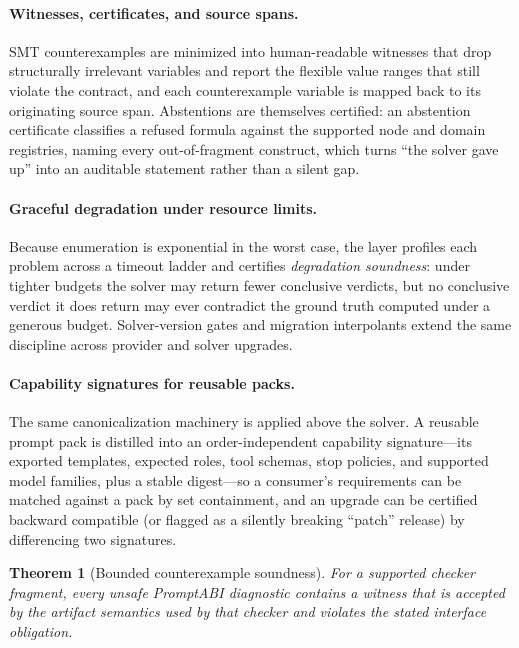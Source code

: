 \documentclass[10pt]{article}
\newtheorem{theorem}{Theorem}
\begin{document}
\paragraph{Witnesses, certificates, and source spans.}
SMT counterexamples are minimized into human-readable witnesses that drop
structurally irrelevant variables and report the flexible value ranges that
still violate the contract, and each counterexample variable is mapped back to
its originating source span. Abstentions are themselves certified: an abstention
certificate classifies a refused formula against the supported node and domain
registries, naming every out-of-fragment construct, which turns ``the solver
gave up'' into an auditable statement rather than a silent gap.

\paragraph{Graceful degradation under resource limits.}
Because enumeration is exponential in the worst case, the layer profiles each
problem across a timeout ladder and certifies \emph{degradation soundness}: under
tighter budgets the solver may return fewer conclusive verdicts, but no
conclusive verdict it does return may ever contradict the ground truth computed
under a generous budget. Solver-version gates and migration interpolants extend
the same discipline across provider and solver upgrades.

\paragraph{Capability signatures for reusable packs.}
The same canonicalization machinery is applied above the solver. A reusable
prompt pack is distilled into an order-independent capability signature---its
exported templates, expected roles, tool schemas, stop policies, and supported
model families, plus a stable digest---so a consumer's requirements can be
matched against a pack by set containment, and an upgrade can be certified
backward compatible (or flagged as a silently breaking ``patch'' release) by
differencing two signatures.

\begin{theorem}[Bounded counterexample soundness]
For a supported checker fragment, every unsafe PromptABI diagnostic contains a
witness that is accepted by the artifact semantics used by that checker and
violates the stated interface obligation.
\end{theorem}
\end{document}

